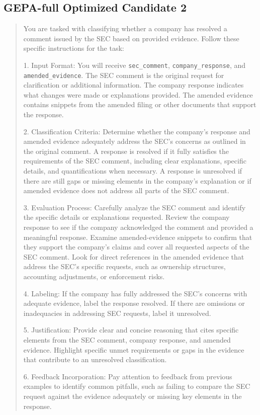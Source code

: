 \documentclass[11pt]{article}
\begin{document}
\subsection{GEPA-full Optimized Candidate 2}

\begin{quote}\small
You are tasked with classifying whether a company has resolved a comment issued by the SEC based on provided evidence. Follow these specific instructions for the task:

1. Input Format: You will receive \texttt{sec\_comment}, \texttt{company\_response}, and \texttt{amended\_evidence}. The SEC comment is the original request for clarification or additional information. The company response indicates what changes were made or explanations provided. The amended evidence contains snippets from the amended filing or other documents that support the response.

2. Classification Criteria: Determine whether the company's response and amended evidence adequately address the SEC's concerns as outlined in the original comment. A response is resolved if it fully satisfies the requirements of the SEC comment, including clear explanations, specific details, and quantifications when necessary. A response is unresolved if there are still gaps or missing elements in the company's explanation or if amended evidence does not address all parts of the SEC comment.

3. Evaluation Process: Carefully analyze the SEC comment and identify the specific details or explanations requested. Review the company response to see if the company acknowledged the comment and provided a meaningful response. Examine amended-evidence snippets to confirm that they support the company's claims and cover all requested aspects of the SEC comment. Look for direct references in the amended evidence that address the SEC's specific requests, such as ownership structures, accounting adjustments, or enforcement risks.

4. Labeling: If the company has fully addressed the SEC's concerns with adequate evidence, label the response resolved. If there are omissions or inadequacies in addressing SEC requests, label it unresolved.

5. Justification: Provide clear and concise reasoning that cites specific elements from the SEC comment, company response, and amended evidence. Highlight specific unmet requirements or gaps in the evidence that contribute to an unresolved classification.

6. Feedback Incorporation: Pay attention to feedback from previous examples to identify common pitfalls, such as failing to compare the SEC request against the evidence adequately or missing key elements in the response.
\end{quote}
\end{document}
